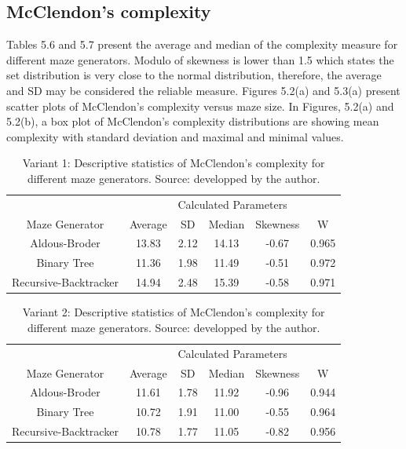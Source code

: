 \subsection{McClendon's complexity}
Tables 5.6 and 5.7 present the average and median of the complexity measure for different maze generators. Modulo of skewness is lower than 1.5 which states the set
distribution is very close to the normal distribution, therefore, the average and SD may be considered the reliable measure. Figures 5.2(a) and 5.3(a) present scatter
plots of McClendon's complexity versus maze size. In Figures, 5.2(a) and 5.2(b), a box plot of McClendon's complexity distributions are showing
mean complexity with standard deviation and maximal and minimal values.\\
\begin{table}[!ht]
    \centering
    \caption{Variant 1: Descriptive statistics of McClendon's complexity for different maze generators. Source: developped by the author.} 
    \begin{tabular}{c c c c c c}
    \hline
        ~&\multicolumn{5}{c}{Calculated Parameters}\\
        Maze Generator & Average & SD & Median & Skewness & W  \\ \hline\hline
        Aldous-Broder & 13.83 & 2.12 & 14.13 & -0.67 & 0.965  \\ 
        Binary Tree  & 11.36 & 1.98 & 11.49 & -0.51 & 0.972 \\ 
        Recursive-Backtracker  & 14.94 & 2.48 & 15.39 & -0.58 & 0.971 \\ \hline
    \end{tabular}
\end{table}  

\begin{table}[!ht]
    \centering
    \caption{Variant 2: Descriptive statistics of McClendon's complexity for different maze generators. Source: developped by the author.} 
    \begin{tabular}{c c c c c c}
    \hline
        ~&\multicolumn{5}{c}{Calculated Parameters}\\
        Maze Generator & Average & SD & Median & Skewness & W  \\ \hline\hline
        Aldous-Broder & 11.61 & 1.78 & 11.92 & -0.96 & 0.944  \\ 
        Binary Tree & 10.72 & 1.91 & 11.00 & -0.55 & 0.964  \\ 
        Recursive-Backtracker & 10.78 & 1.77 & 11.05 & -0.82 & 0.956  \\ \hline
    \end{tabular}
\end{table}

